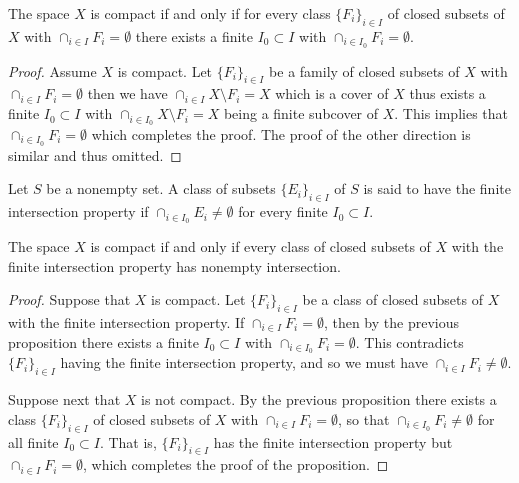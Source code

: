 \documentclass[11pt,a4paper]{article}
\begin{document}
\begin{proposition}\label{prp:fip}
  The space $X$ is compact if and only if for every class 
  $\{F_i\}_{i \in I}$ of closed subsets of $X$ with 
  $\cap_{i \in I}{F_i} = \emptyset$ there exists a finite 
  $I_0 \subset I$ with $\cap_{i \in I_0} {F_i} = \emptyset.$
\end{proposition}
\begin{proof}
  Assume $X$ is compact. Let $\{F_i\}_{i \in I}$ be a family of closed 
  subsets of $X$ with $\cap_{i \in I}{F_i} = \emptyset$ then 
  we have
  $\cap_{i \in I} {X \setminus F_i} = X$ which is a cover of $X$
  thus exists a finite $I_0 \subset I$ with 
  $\cap_{i \in I_0} {X \setminus F_i} = X$ being a finite subcover
  of $X$. This implies that $\cap_{i \in I_0} {F_i} = \emptyset$
  which completes the proof. The proof of the other direction is
  similar and thus omitted. 
\end{proof}

\begin{definition}
  Let $S$ be a nonempty set. A class of subsets $\{E_i\}_{i \in I}$ of 
  $S$ is said to have the finite intersection property if 
  $\cap_{i \in I_0}{E_i} \neq \emptyset$ for every finite 
  $I_0 \subset I$.
\end{definition}

\begin{proposition}
  The space $X$ is compact if and only if every class of closed
  subsets of $X$ with the finite intersection property has nonempty 
  intersection.
\end{proposition}
\begin{proof}
  Suppose that $X$ is compact. Let $\{F_i\}_{i \in I}$ be a class of closed 
  subsets of $X$ with the finite intersection property. 
  If $\cap_{i \in I} F_i = \emptyset$, then by the previous proposition
  there exists a finite $I_0 \subset I$ with 
  $\cap_{i \in I_0} F_i = \emptyset$. 
  This contradicts $\{F_i\}_{i \in I}$ having the finite intersection 
  property, and so we must have $\cap_{i \in I} F_i \neq \emptyset$.

  Suppose next that $X$ is not compact. By the previous proposition there 
  exists a class $\{F_i\}_{i \in I}$ of closed subsets of $X$ 
  with $\cap_{i \in I} F_i = \emptyset$,
  so that $\cap_{i \in I_0} F_i \neq \emptyset$ for all finite
  $I_0 \subset I$. That is, $\{F_i\}_{i \in I}$ has the finite intersection 
  property but $\cap_{i \in I} F_i = \emptyset$, 
  which completes the proof of the proposition.
\end{proof}
\end{document}
